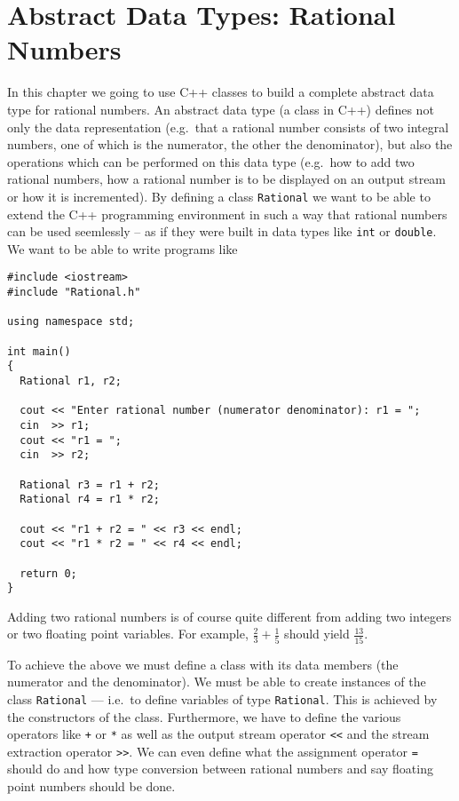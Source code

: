 \chapter{Abstract Data Types: Rational Numbers
             \label{chapADTTemplates}}


In this chapter we going to use C++ classes to build a complete abstract data type
for rational numbers. An abstract data type (a class in C++) defines not only 
the data representation (e.g.\ that a rational number consists of two integral
numbers, one of which is the numerator, the other the denominator), but also
the operations which can be performed on this data type (e.g.\ how to add 
two rational numbers, how a rational number is to be displayed on an output 
stream or how it is incremented).
By defining a class \verb+Rational+
we want to be able to extend the C++ programming environment in such a way that
rational numbers can be used seemlessly -- as if they were built in data types like
\verb+int+ or \verb+double+. We want to be able to write programs like
{\footnotesize \begin{verbatim}
#include <iostream>
#include "Rational.h"

using namespace std;

int main()
{
  Rational r1, r2;

  cout << "Enter rational number (numerator denominator): r1 = ";
  cin  >> r1;
  cout << "r1 = ";
  cin  >> r2;

  Rational r3 = r1 + r2;
  Rational r4 = r1 * r2;

  cout << "r1 + r2 = " << r3 << endl;
  cout << "r1 * r2 = " << r4 << endl;
  
  return 0;
}
\end{verbatim}}

Adding two rational numbers is of course quite different from adding two
integers or two floating point variables. For example, $\frac{2}{3}+\frac{1}{5}$
should yield $\frac{13}{15}$.

To achieve the above we must define a class with its data members (the
numerator and the denominator). We must be able to create instances of the class
\verb+Rational+ --- i.e.\ to define variables of type \verb+Rational+.
This is achieved by the constructors of the class. Furthermore, we have
to define the various operators like \verb&+& or \verb&*& as well as the
output stream operator \verb+<<+ and the stream extraction operator \verb+>>+.
We can even define what the assignment operator \verb+=+ should do and
how type conversion between rational numbers and say floating point
numbers should be done.

